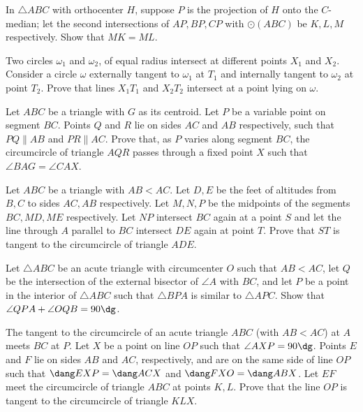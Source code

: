 \begin{probEG}
  In $\triangle ABC$ with orthocenter $H$, suppose $P$ is the projection of $H$
  onto the $C$-median; let the second intersections of $AP,BP,CP$ with
  $\odot(ABC)$ be $K,L,M$ respectively. Show that $MK=ML$.
\end{probEG}

\begin{probEG}[EGMO 2016/4]
  Two circles $\omega_1$ and $\omega_2$, of equal radius intersect at different
  points $X_1$ and $X_2$. Consider a circle $\omega$ externally tangent to
  $\omega_1$ at $T_1$ and internally tangent to $\omega_2$ at point $T_2$. Prove
  that lines $X_1T_1$ and $X_2T_2$ intersect at a point lying on $\omega$.
\end{probEG}

\begin{probEG}
  Let $ABC$ be a triangle with $G$ as its centroid. Let $P$ be a variable point
  on segment $BC$. Points $Q$ and $R$ lie on sides $AC$ and $AB$ respectively,
  such that $PQ\parallel AB$ and $PR\parallel AC$. Prove that, as $P$ varies
  along segment $BC$, the circumcircle of triangle $AQR$ passes through a fixed
  point $X$ such that $\angle BAG=\angle CAX$.
\end{probEG}

\begin{probEG}
  Let $ABC$ be a triangle with $AB<AC$. Let $D,E$ be the feet of altitudes from
  $B,C$ to sides $AC,AB$ respectively. Let $M,N,P$ be the midpoints of the
  segments $BC,MD,ME$ respectively. Let $NP$ intersect $BC$ again at a point $S$
  and let the line through $A$ parallel to $BC$ intersect $DE$ again at point
  $T$. Prove that $ST$ is tangent to the circumcircle of triangle $ADE$.
\end{probEG}

\begin{problem}
  Let $\triangle ABC$ be an acute triangle with circumcenter $O$ such that
  $AB<AC$, let $Q$ be the intersection of the external bisector of $\angle A$
  with $BC$, and let $P$ be a point in the interior of $\triangle ABC$ such that
  $\triangle BPA$ is similar to $\triangle APC$. Show that
  $\angle QPA+\angle OQB=90\dg$.
\end{problem}

\begin{problem}
  The tangent to the circumcircle of an acute triangle $ABC$ (with $AB<AC$) at
  $A$ meets $BC$ at $P$. Let $X$ be a point on line $OP$ such that
  $\angle AXP=90\dg$. Points $E$ and $F$ lie on sides $AB$ and $AC$,
  respectively, and are on the same side of line $OP$ such that
  $\dang EXP=\dang ACX$ and $\dang FXO=\dang ABX $. Let $EF$ meet the
  circumcircle of triangle $ABC$ at points $K,L$. Prove that the line $OP$ is
  tangent to the circumcircle of triangle $KLX$.
\end{problem}

